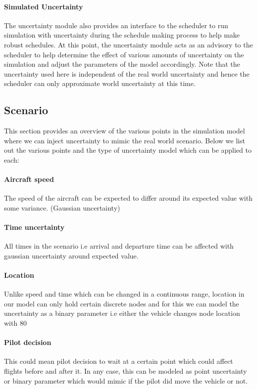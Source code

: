 \documentclass[conference]{IEEEtran}
\begin{document}
\paragraph{Simulated Uncertainty}

The uncertainty module also provides an interface to the scheduler to run simulation with uncertainty during the schedule making process to help make robust schedules. At this point, the uncertainty module acts as an advisory to the scheduler to help determine the effect of various amounts of uncertainty on the simulation and adjust the parameters of the model accordingly. Note that the uncertainty used here is independent of the real world uncertainty and hence the scheduler can only approximate world uncertainty at this time.

\subsection{Scenario}

This section provides an overview of the various points in the simulation model where we can inject uncertainty to mimic the real world scenario. Below we list out the various points and the type of uncertainty model which can be applied to each:

\paragraph{Aircraft speed} The speed of the aircraft can be expected to differ around its expected value with some variance. (Gaussian uncertainty)

\paragraph{Time uncertainty} All times in the scenario i.e arrival and departure time can be affected with gaussian uncertainty around expected value.

\paragraph{Location} Unlike speed and time which can be changed in a continuous range, location in our model can only hold certain discrete nodes and for this we can model the uncertainty as a binary parameter i.e either the vehicle changes node location with 80%
\paragraph{Pilot decision} This could mean pilot decision to wait at a certain point which could affect flights before and after it. In any case, this can be modeled as point uncertainty or binary parameter which would mimic if the pilot did move the vehicle or not.
\end{document}
